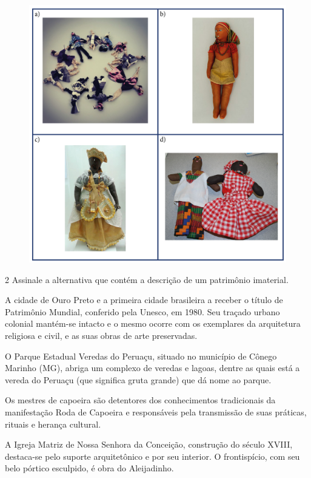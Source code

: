 \begin{figure}[htpb!]
\includegraphics[width=\textwidth]{../ilustracoes/ART5/SAEB_5ANO_ART_FIGURA19.png}
\end{figure}



\num{2}  Assinale a alternativa que contém a descrição de um patrimônio imaterial.

\begin{escolha}
\item
  A cidade de Ouro Preto e a primeira cidade brasileira a receber o
  título de Patrimônio Mundial, conferido pela Unesco, em 1980. Seu
  traçado urbano colonial mantém-se intacto e o mesmo ocorre com os
  exemplares da arquitetura religiosa e civil, e as suas obras de arte
  preservadas.
\item
  O Parque Estadual Veredas do Peruaçu, situado no município de Cônego
  Marinho (MG), abriga um complexo de veredas e lagoas, dentre as quais
  está a vereda do Peruaçu (que significa gruta grande) que dá nome ao
  parque.
\item
  Os mestres de capoeira são detentores dos conhecimentos tradicionais
  da manifestação Roda de Capoeira e responsáveis pela transmissão de
  suas práticas, rituais e herança cultural.
\item
  A Igreja Matriz de Nossa Senhora da Conceição, construção do século
  XVIII, destaca-se pelo suporte arquitetônico e por seu interior. O
  frontispício, com seu belo pórtico esculpido, é obra do Aleijadinho.
\end{escolha}



